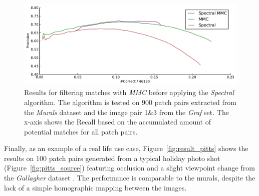 \begin{figure}[htb]
	\centering
	\includegraphics[width=1\textwidth]{images/result_spectral-mmc}
	\caption{Results for filtering matches with \emph{MMC} before 
	applying the \emph{Spectral} algorithm. The algorithm is tested on 
900 patch pairs extracted from the \emph{Murals} dataset and the image 
pair 1\&3 from the \emph{Graf} set. The x-axis shows the Recall based on 
the accumulated amount of potential matches for all patch pairs.}
	\label{fig:result_spectral-mmc}
\end{figure}

Finally, as an example of a real life use case, 
Figure~\ref{fig:result_pitts} shows the results on 100 patch pairs 
generated from a typical holiday photo shot 
(Figure~\ref{fig:pitts_source}) featuring occlusion and a slight 
viewpoint change from the \emph{Gallagher} dataset \cite{gallagher2008}.  
The performance is comparable to the murals, despite the lack of a 
simple homographic mapping between the images.


